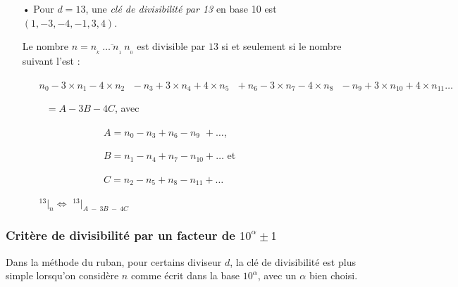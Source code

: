 \documentclass[a4paper]{article}
\begin{document}
\begin{small}
\begin{itemize}
	\vspace{0.5cm}
	
	\item[•] Pour $d = 13$, une \textit{clé de divisibilité par 13} en base 10 est $(1, -3, -4, -1, 3, 4)$.
	
	\vspace{0.2cm}
	
	Le nombre $n = \overline{n_{_{k}}~\dots~n_{_1}~n_{_0}}$ est divisible par $13$ si et seulement si le nombre suivant l'est :
	
	\vspace{0.2cm}
	
	\begin{itemize}
		\item[] $n_0 - 3 \times n_1 - 4 \times n_2 ~~~ - n_3 + 3 \times n_4 + 4 \times n_5 ~~~ + n_6 - 3 \times n_7 - 4 \times n_8 ~~~ - n_9 + 3 \times n_{10} + 4 \times n_{11}\dots$ 
		\item[] $~~~ = A - 3B - 4C$, avec 
		
		\begin{itemize}
			\item[] ~~~~~~~~~ $A = n_0 - n_3 + n_6 - n_{9\phantom{0}}    + \dots$, 
			\item[] ~~~~~~~~~ $B = n_1 - n_4 + n_7 - n_{10} + \dots$ 	et  	
			\item[] ~~~~~~~~~ $C = n_2 - n_5 + n_8 - n_{11} + \dots$
		\end{itemize}
		
		\vspace{0.2cm}		
		
		\item[] {\Large $ ^{13}|_n \Leftrightarrow$ $^{13}|_{A~-~3B~-~4C} $}\\
		
	\end{itemize}
	

\end{itemize}
\end{small}

\pagebreak







\subsubsection*{Critère de divisibilité par un facteur de {\boldmath $10^{\alpha} \pm 1$}}\label{subsection_critere_10_plus_ou_moins_1}

	Dans la méthode du ruban, pour certains diviseur $d$, la clé de divisibilité est plus simple lorsqu'on considère $n$ comme écrit dans la base $10^\alpha$, avec un $\alpha$ bien choisi.\\
\end{document}

